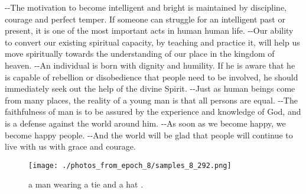 \documentclass{article}%
\begin{document}
{-}{-}The motivation to become intelligent and bright is maintained by discipline, courage and perfect temper. If someone can struggle for an intelligent past or present, it is one of the most important acts in human human life.\newline%
{-}{-}Our ability to convert our existing spiritual capacity, by teaching and practice it, will help us move spiritually towards the understanding of our place in the kingdom of heaven.\newline%
{-}{-}An individual is born with dignity and humility. If he is aware that he is capable of rebellion or disobedience that people need to be involved, he should immediately seek out the help of the divine Spirit.\newline%
{-}{-}Just as human beings come from many places, the reality of a young man is that all persons are equal.\newline%
{-}{-}The faithfulness of man is to be assured by the experience and knowledge of God, and is a defense against the world around him.\newline%
{-}{-}As soon as we become happy, we become happy people.\newline%
{-}{-}And the world will be glad that people will continue to live with us with grace and courage.\newline%

%


\begin{figure}[h!]%
\centering%
\texttt{[image: ./photos\_from\_epoch\_8/samples\_8\_292.png]}%
\caption{a man wearing a tie and a hat .}%
\end{figure}

%
\end{document}
